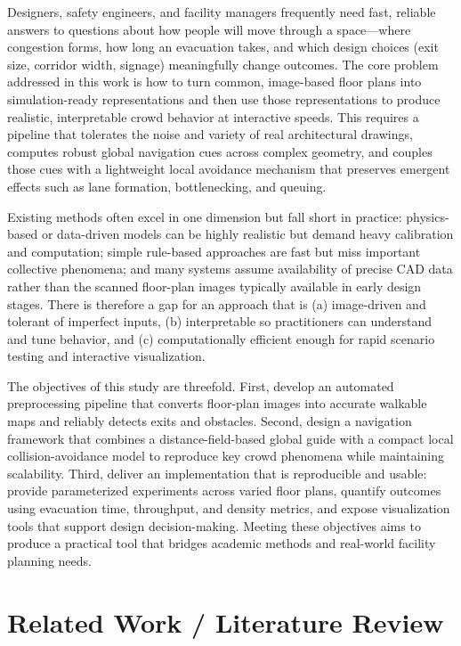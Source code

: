 \documentclass[conference]{IEEEtran}
\begin{document}
Designers, safety engineers, and facility managers frequently need fast,
reliable answers to questions about how people will move through a space—where
congestion forms, how long an evacuation takes, and which design choices (exit
size, corridor width, signage) meaningfully change outcomes. The core problem
addressed in this work is how to turn common, image-based floor plans into
simulation-ready representations and then use those representations to produce
realistic, interpretable crowd behavior at interactive speeds. This requires a
pipeline that tolerates the noise and variety of real architectural drawings,
computes robust global navigation cues across complex geometry, and couples
those cues with a lightweight local avoidance mechanism that preserves emergent
effects such as lane formation, bottlenecking, and queuing.

Existing methods often excel in one dimension but fall short in practice:
physics-based or data-driven models can be highly realistic but demand heavy
calibration and computation; simple rule-based approaches are fast but miss
important collective phenomena; and many systems assume availability of precise
CAD data rather than the scanned floor-plan images typically available in early
design stages. There is therefore a gap for an approach that is (a)
image-driven and tolerant of imperfect inputs, (b) interpretable so
practitioners can understand and tune behavior, and (c) computationally
efficient enough for rapid scenario testing and interactive visualization.

The objectives of this study are threefold. First, develop an automated
preprocessing pipeline that converts floor-plan images into accurate walkable
maps and reliably detects exits and obstacles. Second, design a navigation
framework that combines a distance-field-based global guide with a compact
local collision-avoidance model to reproduce key crowd phenomena while
maintaining scalability. Third, deliver an implementation that is reproducible
and usable: provide parameterized experiments across varied floor plans,
quantify outcomes using evacuation time, throughput, and density metrics, and
expose visualization tools that support design decision-making. Meeting these
objectives aims to produce a practical tool that bridges academic methods and
real-world facility planning needs.

\section{Related Work / Literature Review}
\end{document}
